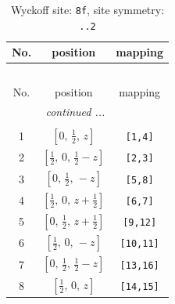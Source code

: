 \documentclass[fleqn,8pt]{jsarticle}
\begin{document}
\begin{longtable}{ccc}
\caption{Wyckoff site: {\tt 8f}, site symmetry: {\tt ..2}}
 \\
 \hline \hline
No. & position & mapping \\ \hline \endfirsthead

\multicolumn{2}{l}{\tablename\ \thetable{}} \\
 \hline \hline
No. & position & mapping \\ \hline \endhead

 \hline \hline
\multicolumn{2}{r}{\footnotesize\it continued ...} \\ \endfoot

 \hline \hline
\multicolumn{2}{r}{} \\ \endlastfoot

1 & $\left[ 0,\, \frac{1}{2},\, z \right]$ & {\tt [1,4]} \\ \hline
2 & $\left[ \frac{1}{2},\, 0,\, \frac{1}{2} - z \right]$ & {\tt [2,3]} \\ \hline
3 & $\left[ 0,\, \frac{1}{2},\, - z \right]$ & {\tt [5,8]} \\ \hline
4 & $\left[ \frac{1}{2},\, 0,\, z + \frac{1}{2} \right]$ & {\tt [6,7]} \\ \hline
5 & $\left[ 0,\, \frac{1}{2},\, z + \frac{1}{2} \right]$ & {\tt [9,12]} \\ \hline
6 & $\left[ \frac{1}{2},\, 0,\, - z \right]$ & {\tt [10,11]} \\ \hline
7 & $\left[ 0,\, \frac{1}{2},\, \frac{1}{2} - z \right]$ & {\tt [13,16]} \\ \hline
8 & $\left[ \frac{1}{2},\, 0,\, z \right]$ & {\tt [14,15]} \\
\end{longtable}
\renewcommand{\arraystretch}{1.2}
\end{document}
